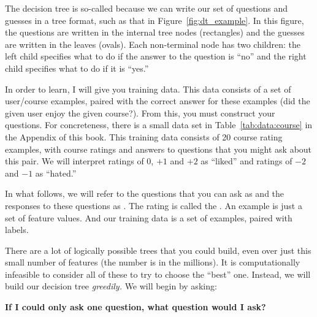 \MoveNextFigure{-10cm}

The decision tree is so-called because we can write our set of
questions and guesses in a tree format, such as that in
Figure~\ref{fig:dt_example}.  In this figure, the questions are
written in the internal tree nodes (rectangles) and the guesses are
written in the leaves (ovals).  Each non-terminal node has two
children: the left child specifies what to do if the answer to the
question is ``no'' and the right child specifies what to do if it is
``yes.''

In order to learn, I will give you training data.  This data consists
of a set of user/course examples, paired with the correct answer for
these examples (did the given user enjoy the given course?).  From
this, you must construct your questions.  For concreteness, there is a
small data set in Table~\ref{tab:data:course} in the Appendix of this
book.  This training data consists of 20 course rating examples, with
course ratings and answers to questions that you might ask about this
pair.  We will interpret ratings of $0$, $+1$ and $+2$ as ``liked'' and
ratings of $-2$ and $-1$ as ``hated.''

In what follows, we will refer to the questions that you can ask as
 and the responses to these questions as
.  The rating is called the .
An example is just a set of feature values.  And our training data is
a set of examples, paired with labels.

There are a lot of logically possible trees that you could build, even
over just this small number of features (the number is in the
millions).  It is computationally infeasible to consider all of these
to try to choose the ``best'' one.  Instead, we will build our
decision tree \emph{greedily.}  We will begin by asking:

{\bf If I could only ask one question, what question would I ask?}


\MoveNextFigure{-10cm}


